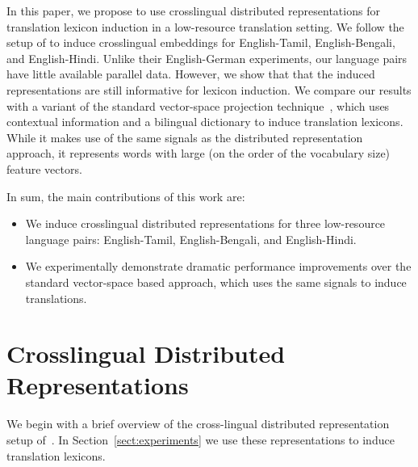 \documentclass[11pt]{article}
\newcommand{\secref}[1]{Section~\ref{#1}}
\begin{document}
In this paper, we propose to use crosslingual distributed representations for translation lexicon induction in a low-resource translation setting.  We follow the setup of  to induce crosslingual embeddings for English-Tamil, English-Bengali, and English-Hindi.  Unlike their English-German experiments, our language pairs have little available parallel data.  However, we show that that the induced representations are still informative for lexicon induction.  
We compare our results with a variant of the standard vector-space projection technique~\cite{fung98}, which uses contextual information and a bilingual dictionary to induce translation lexicons.  
While it makes use of the same signals as the distributed representation approach, it represents words with large (on the order of the vocabulary size) feature vectors.

In sum, the main contributions of this work are:

\begin{itemize}
  \item We induce crosslingual distributed representations for three low-resource language pairs: English-Tamil, English-Bengali, and English-Hindi.  %
  \item We experimentally demonstrate dramatic performance improvements over the standard vector-space based approach, which uses the same signals to induce translations.
\end{itemize}

\section{Crosslingual Distributed Representations} \label{sect:background}

We begin with a brief overview of the cross-lingual distributed representation setup of~. In \secref{sect:experiments} we use these representations to induce translation lexicons. 
\end{document}
